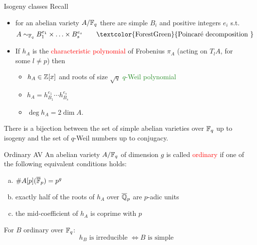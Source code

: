 \documentclass[usenames,dvipsnames]{beamer}
\newcommand{\red}[1]{\textcolor{red}{#1}}
\newcommand{\green}[1]{\textcolor{ForestGreen}{#1}}
\begin{document}
\begin{frame}{ Isogeny classes }
Recall
\begin{itemize}
 \item for an abelian variety $A/\mathbb{F}_q$ there are simple $B_i$ and positive integers $e_i$ s.t.
  \[ A \sim_{\F_q} B_1^{e_1}\times \ldots \times B_s^{e_s} \qquad\text{\green{Poincar\'e decomposition }}\] 
 \pause \item If $h_A$ is the \red{characteristic polynomial} of Frobenius $\pi_A$ (acting on $T_lA$, for some $l\neq p$) then
    \begin{itemize}
      \pause \item $h_A\in \mathbb{Z}[x]$ and roots of size $\sqrt{q}$ \qquad\green{$q$-Weil polynomial}
      \pause \item $ h_A = h_{B_1}^{e_1}\cdots h_{B_s}^{e_s} $
      \pause \item $\deg h_A = 2\dim A$.
    \end{itemize}
\end{itemize}
  \pause \begin{thm}
   There is a bijection between the set of simple abelian varieties over $\mathbb{F}_q$ up to isogeny and the set of $q$-Weil numbers up to conjugacy.
  \end{thm}
\end{frame}

\begin{frame}{ Ordinary AV }
  An abelian variety $A/\mathbb{F}_q$ of dimension $g$ is called \red{ordinary} if one of the following equivalent conditions holds:
  \begin{enumerate}[(a)]
   \pause \item $\#A[p](\overline{\mathbb{F}}_p)=p^g$
   \pause \item exactly half of the roots of $h_A$ over $\overline{\mathbb{Q}}_p$ are $p$-adic units
   \pause \item the mid-coefficient of $h_A$ is coprime with $p$
  \end{enumerate}
  \pause
  \begin{prop}
  For $B$ ordinary over $\mathbb{F}_q$:
   \[ h_B \text{ is irreducible } \Longleftrightarrow B \text{ is simple}\]
  \end{prop}
\end{frame}
\end{document}
